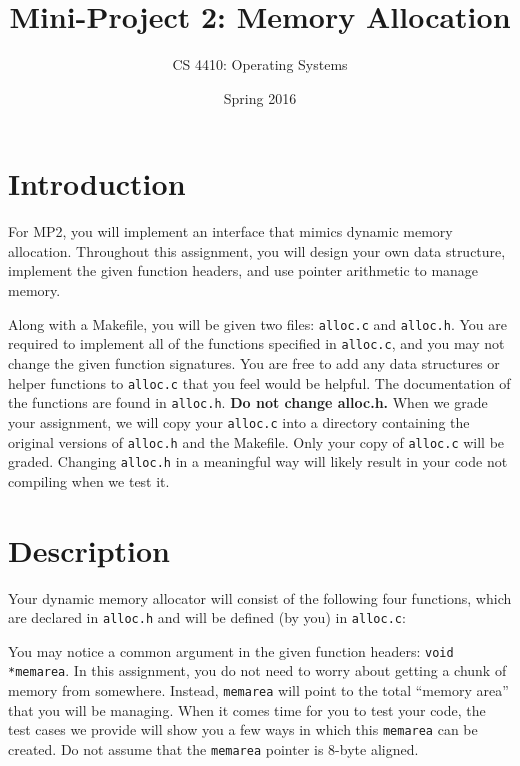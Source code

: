 \documentclass[12pt]{article}
\begin{document}
\pagestyle{fancy}
\fancyhf{}
\setlength{\headheight}{1.25em}

{
    \fancyhf{}
}

\lstset{language=C}

\title{Mini-Project 2: Memory Allocation}
\author{CS 4410: Operating Systems}
\date{Spring 2016}
\maketitle
\thispagestyle{first}

\section{Introduction}

For MP2, you will implement an interface that mimics dynamic memory allocation. Throughout this assignment, you will design your own data structure, implement the given function headers, and use pointer arithmetic to manage memory.

Along with a Makefile, you will be given two files: \texttt{alloc.c} and \texttt{alloc.h}. You are required to implement all of the functions specified in \texttt{alloc.c}, and you may not change the given function signatures. You are free to add any data structures or helper functions to \texttt{alloc.c} that you feel would be helpful. The documentation of the functions are found in \texttt{alloc.h}. \textbf{Do not change alloc.h.} When we grade your assignment, we will copy your \texttt{alloc.c} into a directory containing the original versions of \texttt{alloc.h} and the Makefile. Only your copy of \texttt{alloc.c} will be graded. Changing \texttt{alloc.h} in a meaningful way will likely result in your code not compiling when we test it. 

\section{Description}

Your dynamic memory allocator will consist of the following four functions, which are declared in \texttt{alloc.h} and will be defined (by you) in
\texttt{alloc.c}:

You may notice a common argument in the given function headers: \texttt{void *memarea}. In this assignment, you do not need to worry about getting a chunk of memory from somewhere. Instead, \texttt{memarea} will point to the total ``memory area'' that you will be managing. When it comes time for you to test your code, the test cases we provide will show you a few ways in which this \texttt{memarea} can be created. Do not assume that the \texttt{memarea} pointer is 8-byte aligned.
\end{document}
